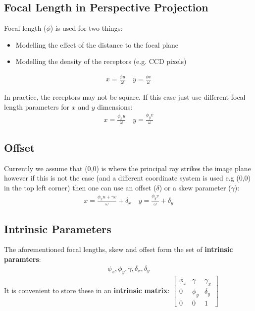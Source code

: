\documentclass{article}
\begin{document}
\subsection{Focal Length in Perspective Projection}
Focal length ($\phi$) is used for two things:
\begin{itemize}
	\item Modelling the effect of the distance to the focal plane
	\item Modelling the density of the receptors (e.g. CCD pixels)
\end{itemize}

\begin{align*}
	x = \frac{\phi u}{\omega} \quad  y = \frac{\phi v}{\omega}
\end{align*}

In practice, the receptors may not be square.
If this case just use different focal length parameters for $x$ and $y$ dimensions:
\begin{align*}
	x = \frac{\phi_x u}{\omega} \quad  y = \frac{\phi_y v}{\omega}
\end{align*}

\subsection{Offset}
Currently we assume that (0,0) is where the principal ray strikes the image plane however if this is not the case (and a different coordinate system is used e.g (0,0) in the top left corner) then one can use an offset ($\delta$) or a skew parameter ($\gamma$):
\begin{align*}
	x = \frac{\phi_x u + \gamma v}{\omega}+\delta_x \quad  y = \frac{\phi_y v}{\omega}+\delta_y
\end{align*}
\subsection{Intrinsic Parameters}
The aforementioned focal lengths, skew and offset form the set of {\bf intrinsic} {\bf paramters}:
\begin{align*}
	{\phi_x, \phi_y, \gamma, \delta_x, \delta_y}
\end{align*}
It is convenient to store these in an {\bf intrinsic} {\bf matrix}:
$
\begin{bmatrix}
	\phi_x & \gamma & \gamma_x \\
	0 & \phi_y & \delta_y \\
	0 & 0 & 1
\end{bmatrix}
$
\end{document}

